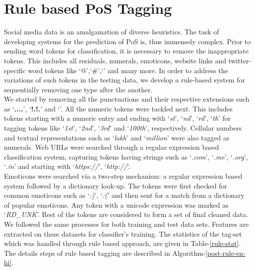 \documentclass[11pt,a4paper]{article}
\begin{document}
\section{Rule based PoS Tagging}
Social media data is an amalgamation of diverse heuristics. The task of developing systems for the prediction of PoS is, thus immensely complex. Prior to sending word tokens for classification, it is necessary to remove the inappropriate tokens. This includes all residuals, numerals, emoticons, website links and twitter-specific word tokens like `@',`\#',`\texttildelow' and many more. In order to address the variations of such tokens in the testing data, we develop a rule-based system for sequentially removing one type after the another.\\
We started by removing all the punctuations and their respective extensions such as `\textbf{....}', `\textbf{!.!.}' and `\textbf{\texttildelow}'. All the numeric tokens were tackled next. This includes tokens starting with a numeric entry and ending with `\textit{st}', `\textit{nd}', `\textit{rd}', `\textit{th}' for tagging tokens like `\textit{1st}', `\textit{2nd}', `\textit{3rd}' and `\textit{100th}', respectively. Cellular numbers and textual representations such as `\textit{lakh}' and `\textit{million}' were also tagged as numerals. Web URLs were searched through a regular expression based classification system, capturing tokens having strings such as `\textit{.com}', `\textit{.me}', `\textit{.org}', `\textit{.in}' and starting with `\textit{https://}', `\textit{http://}'. \\
Emoticons were searched via a two-step mechanism: a regular expression based system followed by a dictionary look-up. The tokens were first checked for common emoticons such as `\textit{:)}', `\textit{:(}' and then sent for a match from a dictionary of popular emoticons. Any token with a unicode expression was marked as `\textit{RD\_UNK}'. Rest of the tokens are considered to form a set of final cleaned data. We followed the same processes for both training and test data sets. Features are extracted on these datasets for classifier's training. 
The statistics of the tag-set which was handled through rule based approach, are given in  Table-\ref{rule-stat}. The details steps of rule based tagging are described in Algorithm-\ref{post-rule-en-hi}.
\end{document}
